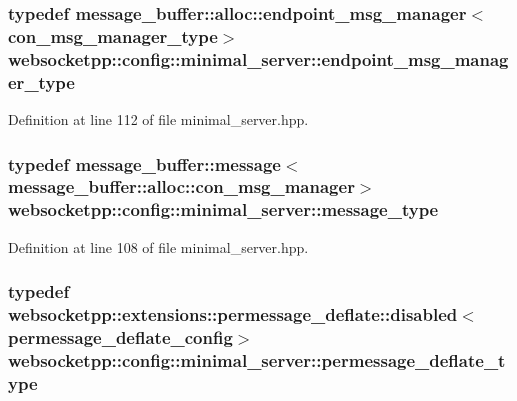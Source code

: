 \subsubsection[{endpoint\+\_\+msg\+\_\+manager\+\_\+type}]{\setlength{\rightskip}{0pt plus 5cm}typedef {\bf message\+\_\+buffer\+::alloc\+::endpoint\+\_\+msg\+\_\+manager}$<${\bf con\+\_\+msg\+\_\+manager\+\_\+type}$>$ {\bf websocketpp\+::config\+::minimal\+\_\+server\+::endpoint\+\_\+msg\+\_\+manager\+\_\+type}}\label{structwebsocketpp_1_1config_1_1minimal__server_aeb6079297c7d7ceb1742178e00d11b34}


Definition at line 112 of file minimal\+\_\+server.\+hpp.

\hypertarget{structwebsocketpp_1_1config_1_1minimal__server_aecd1340269c1429fe37f042ec4b3cfac}{}
\subsubsection[{message\+\_\+type}]{\setlength{\rightskip}{0pt plus 5cm}typedef {\bf message\+\_\+buffer\+::message}$<${\bf message\+\_\+buffer\+::alloc\+::con\+\_\+msg\+\_\+manager}$>$ {\bf websocketpp\+::config\+::minimal\+\_\+server\+::message\+\_\+type}}\label{structwebsocketpp_1_1config_1_1minimal__server_aecd1340269c1429fe37f042ec4b3cfac}


Definition at line 108 of file minimal\+\_\+server.\+hpp.

\hypertarget{structwebsocketpp_1_1config_1_1minimal__server_acd4073d1c0f2da6a4b0080978117437a}{}
\subsubsection[{permessage\+\_\+deflate\+\_\+type}]{\setlength{\rightskip}{0pt plus 5cm}typedef {\bf websocketpp\+::extensions\+::permessage\+\_\+deflate\+::disabled}$<${\bf permessage\+\_\+deflate\+\_\+config}$>$ {\bf websocketpp\+::config\+::minimal\+\_\+server\+::permessage\+\_\+deflate\+\_\+type}}\label{structwebsocketpp_1_1config_1_1minimal__server_acd4073d1c0f2da6a4b0080978117437a}


